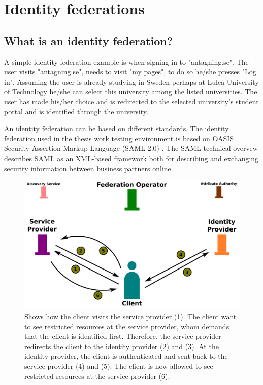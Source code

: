 \section{Identity federations}
\subsection{What is an identity federation?}

A simple identity federation example is when signing in to "antagning.se". 
The user visits "antagning.se", needs to visit "my pages", to do so he/she presses "Log in". 
Assuming the user is already studying in Sweden perhaps at Lule\r{a} University of Technology he/she 
can select this university among the listed universities. 
The user has made his/her choice and is redirected to the selected university's student portal and is identified through the university. 

An identity federation can be based on different standards.
The identity federation used in the thesis work testing environment is based on OASIS Security Assertion Markup Language (SAML 2.0) \cite{pdf:oasis-open-core,pdf:oasis-open-metadata,pdf:oasis-open-metadata-profile,pdf:oasis-open-bindings,pdf:oasis-open-profiles,pdf:oasis-open-glossary,pdf:oasis-open}. 
The SAML technical overvew \cite[p.~8]{pdf:oasis-open} describes SAML as an XML-based framework both for
describing and exchanging security information between business partners online.    

\begin{figure}[ht]
\begin{center}
\includegraphics[scale=1]{Figures/identityFed.png}
\end{center}
\caption{Shows how the client visits the service provider (1). 
The client want to see restricted resources at the service provider, whom demands that the client is identified first. 
Therefore, the service provider redirects the client to the identity provider (2) and (3). 
At the identity provider, the client is authenticated and sent back to the service provider (4) and (5). 
The client is now allowed to see restricted resources at the service provider (6).\label{ch3:IdentityFed}}
\end{figure}



